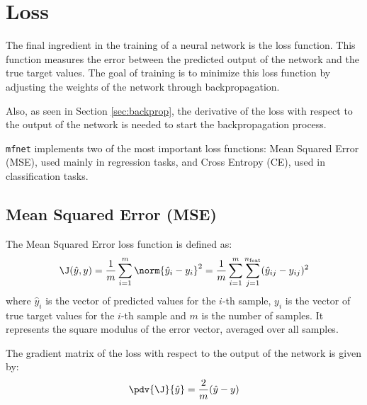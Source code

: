 \section{Loss}
The final ingredient in the training of a neural network is the loss function. This function measures the error between the predicted output of the network and the true target values. The goal of training is to minimize this loss function by adjusting the weights of the network through backpropagation.

Also, as seen in Section \ref{sec:backprop}, the derivative of the loss with respect to the output of the network is needed to start the backpropagation process.

\texttt{mfnet} implements two of the most important loss functions: Mean Squared Error (MSE), used mainly in regression tasks, and Cross Entropy (CE), used in classification tasks.

\subsection{Mean Squared Error (MSE)}
The Mean Squared Error loss function is defined as:
\begin{equation}
    \J(\hat{y}, y) = \frac{1}{m} \sum_{i=1}^{m} \norm{\hat{y}_i - y_i}^2 = \frac{1}{m} \sum_{i=1}^{m} \sum_{j=1}^{n_\text{feat}} (\hat{y}_{ij} - y_{ij})^2
\end{equation}
where $\hat{y}_i$ is the vector of predicted values for the $i$-th sample, $y_i$ is the vector of true target values for the $i$-th sample and $m$ is the number of samples. It represents the square modulus of the error vector, averaged over all samples.

The gradient matrix of the loss with respect to the output of the network is given by:
\begin{equation}
    \pdv{\J}{\hat{y}} = \frac{2}{m} (\hat{y} - y)
\end{equation}

